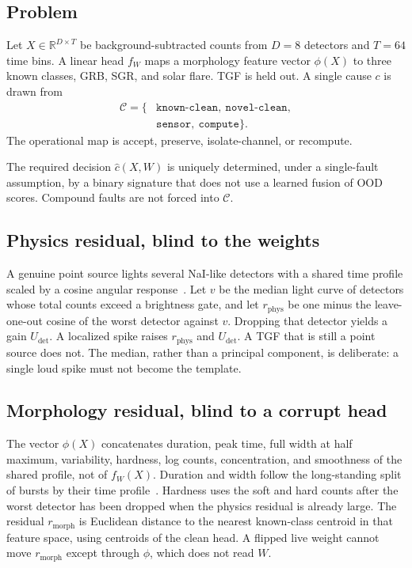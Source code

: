 \documentclass{ieeeaccess}
\begin{document}
\subsection{Problem}

Let $X\in\mathbb{R}^{D\times T}$ be background-subtracted counts from $D=8$ detectors and $T=64$ time bins. A linear head $f_W$ maps a morphology feature vector $\phi(X)$ to three known classes, GRB, SGR, and solar flare. TGF is held out. A single cause $c$ is drawn from
\begin{align*}
\mathcal{C}=\{&\texttt{known-clean},\ \texttt{novel-clean},\\
&\texttt{sensor},\ \texttt{compute}\}.
\end{align*}
The operational map is accept, preserve, isolate-channel, or recompute.

The required decision $\hat{c}(X,W)$ is uniquely determined, under a single-fault assumption, by a binary signature that does not use a learned fusion of OOD scores. Compound faults are not forced into $\mathcal{C}$.

\subsection{Physics residual, blind to the weights}

A genuine point source lights several NaI-like detectors with a shared time profile scaled by a cosine angular response~\cite{meegan2009}. Let $v$ be the median light curve of detectors whose total counts exceed a brightness gate, and let $r_{\mathrm{phys}}$ be one minus the leave-one-out cosine of the worst detector against $v$. Dropping that detector yields a gain $U_{\mathrm{det}}$. A localized spike raises $r_{\mathrm{phys}}$ and $U_{\mathrm{det}}$. A TGF that is still a point source does not. The median, rather than a principal component, is deliberate: a single loud spike must not become the template.

\subsection{Morphology residual, blind to a corrupt head}

The vector $\phi(X)$ concatenates duration, peak time, full width at half maximum, variability, hardness, log counts, concentration, and smoothness of the shared profile, not of $f_W(X)$. Duration and width follow the long-standing split of bursts by their time profile~\cite{kouveliotou1993}. Hardness uses the soft and hard counts after the worst detector has been dropped when the physics residual is already large. The residual $r_{\mathrm{morph}}$ is Euclidean distance to the nearest known-class centroid in that feature space, using centroids of the clean head. A flipped live weight cannot move $r_{\mathrm{morph}}$ except through $\phi$, which does not read $W$.
\end{document}
